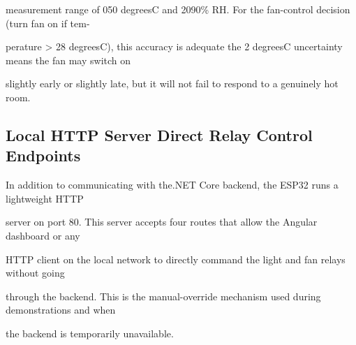 measurement range of 050 degreesC and 2090\% RH. For the fan-control decision (turn fan on if tem-

perature > 28 degreesC), this accuracy is adequate  the 2 degreesC uncertainty means the fan may switch on

slightly early or slightly late, but it will not fail to respond to a genuinely hot room.


\subsection{Local HTTP Server  Direct Relay Control Endpoints}
In addition to communicating with the.NET Core backend, the ESP32 runs a lightweight HTTP

server on port 80. This server accepts four routes that allow the Angular dashboard  or any

HTTP client on the local network  to directly command the light and fan relays without going

through the backend. This is the manual-override mechanism used during demonstrations and when

the backend is temporarily unavailable.


